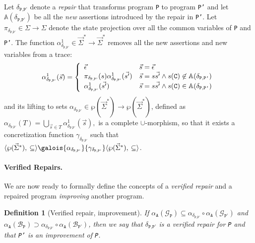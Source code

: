 \documentclass[10pt]{sigplanconf}
\newtheorem{definition}{Definition}
\newcommand{\labelDef}[1]{\label{def:#1}}
\newcommand{\code}[1]{\texttt{#1}}
\newcommand{\ltuple}[1]{\langle#1,\allowbreak}
\newcommand{\rtuple}[1]{\:#1\rangle}
\newcommand{\pair}[2]{\ltuple{#1}\rtuple{#2}}
\newcommand{\diff}[2]{\delta_{\code{#1}, \code{#2}}}
\newcommand{\emptytrace}{\vec{\epsilon}}
\begin{document}
Let $\diff{P}{P'}$ denote a {\em repair} that transforms program
\code{P} to program \code{P'} and let $\mathbb{A}(\diff{P}{P'})$ be 
all the \emph{new} assertions introduced by the
repair in \code{P'}. Let $\pi_{\diff{P}{P'}} \in \Sigma \rightarrow
\Sigma$ denote the state projection over all the common variables of \code{P} and \code{P'}.
The function $\alpha^1_{\diff{P}{P'}} \in \vec{\Sigma}^\ast
\rightarrow \vec{\Sigma}^\ast$ removes all the new assertions and
new variables from a trace:
\[
\alpha^1_{\diff{P}{P'}}(\vec{s}) = \left\{
\begin{array}{l l}
  \emptytrace                 & \vec{s} = \emptytrace \\
  \pi_{\diff{P}{P'}}(s)\alpha^1_{\diff{P}{P'}}(\vec{s'}) & \vec{s} = s\vec{s'} \wedge s(\code{C}) \not \in \mathbb{A}(\diff{P}{P'}) \\
  \alpha^1_{\diff{P}{P'}}(\vec{s'})  &  \vec{s} = s\vec{s'} \wedge s(\code{C}) \in \mathbb{A}(\diff{P}{P'}) \\
\end{array}
\right.
\]
and its lifting to sets  $\alpha_{\diff{P}{P'}} \in  \wp(\vec{\Sigma}^\ast) \rightarrow \wp(\vec{\Sigma}^\ast)$, defined as 
\(
\alpha_{\diff{P}{P'}}(T) = \bigcup_{\vec{s} \in T} \alpha^1_{\diff{P}{P'}}(\vec{s}),
\)
is a complete $\cup$-morphism, so that it exists a concretization function $\gamma_{\diff{P}{P'}}$ such that $\pair{\wp(\vec{\Sigma}^\ast)}{\subseteq}\galois{{\alpha_{\diff{P}{P'}}}}{{\gamma_{\diff{P}{P'}}}}\pair{\wp(\vec{\Sigma}^\ast)}{\subseteq}$.

\paragraph{Verified Repairs.}
We are now ready to formally define the concepts of a {\em verified
repair} and a repaired program {\em improving} another program.

\begin{definition}[Verified repair, improvement]
\labelDef{SemanticFixes}
If $\alpha_\code{A}(\mathcal{G}_\code{P}) \subseteq \alpha_{\diff{P}{P'}} \circ \alpha_\code{A}(\mathcal{G}_\code{P'})$ and 
$\alpha_\code{A}(\mathcal{B}_\code{P}) \supset \alpha_{\diff{P}{P'}} \circ \alpha_\code{A}(\mathcal{B}_\code{P'})$, then we say that  $\diff{P}{P'}$ is a verified repair for \code{P} and that \code{P'} is an improvement of \code{P}.
\end{definition}
\end{document}
